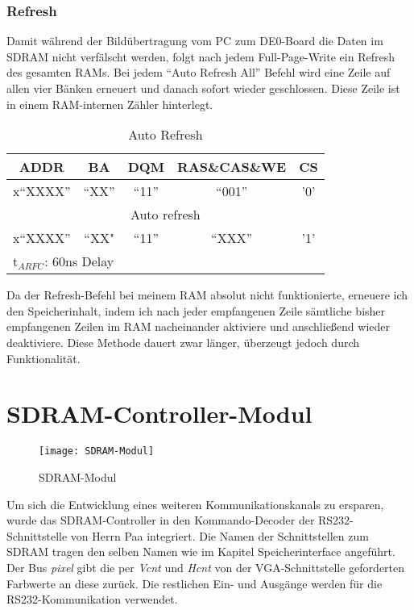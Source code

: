 \subsubsection*{Refresh}

Damit während der Bildübertragung vom PC zum DE0-Board die Daten im SDRAM nicht verfälscht werden, folgt nach jedem Full-Page-Write ein Refresh des gesamten RAMs. Bei jedem "`Auto Refresh All"' Befehl wird eine Zeile auf allen vier Bänken erneuert und danach sofort wieder geschlossen. Diese Zeile ist in einem RAM-internen Zähler hinterlegt.

\begin{table}[h!]
\caption{Auto Refresh}
\label{tab:ref-seq}
\centering
\setlength{\tabcolsep}{1ex}
\def\arraystretch{1.20}
\setlength{\tabcolsep}{1ex}
\small
\begin{tabularx}{\textwidth}{|ccccc|}
\hline 
ADDR & BA & DQM & RAS\&CAS\&WE & CS\\ 
\hline 
x``XXXX'' & ``XX'' & ``11'' & ``001'' & '0'\\
\multicolumn{5}{|X|}{Auto refresh} \\ 
\hline 
x``XXXX'' & ``XX" & ``11'' & ``XXX'' & '1'  \\ 
\multicolumn{5}{|l|}{t$_{ARFC}$: 60ns Delay} \\
\hline 
\end{tabularx} 
\end{table}
\FloatBarrier

Da der Refresh-Befehl bei meinem RAM absolut nicht funktionierte, erneuere ich den Speicherinhalt, indem ich nach jeder empfangenen Zeile sämtliche bisher empfangenen Zeilen im RAM nacheinander aktiviere und anschließend wieder deaktiviere. Diese Methode dauert zwar länger, überzeugt jedoch durch Funktionalität.
\newpage
\section{SDRAM-Controller-Modul}

\begin{wrapfigure}{r}{0.4\textwidth}
\label{fig:SDRAM}
  \begin{center}
    \texttt{[image: SDRAM-Modul]}
  \end{center}
  \caption{SDRAM-Modul}
\end{wrapfigure}

Um sich die Entwicklung eines weiteren Kommunikationskanals zu ersparen, wurde das SDRAM-Controller in den Kommando-Decoder der RS232-Schnittstelle von Herrn Paa integriert. Die Namen der Schnittstellen zum SDRAM tragen den selben Namen wie im Kapitel Speicherinterface angeführt. Der Bus \emph{pixel} gibt die per \emph{Vcnt} und \emph{Hcnt} von der VGA-Schnitt\-stel\-le geforderten Farbwerte an diese zurück. Die restlichen Ein- und Ausgänge werden für die RS232-Kommunikation verwendet.
\FloatBarrier